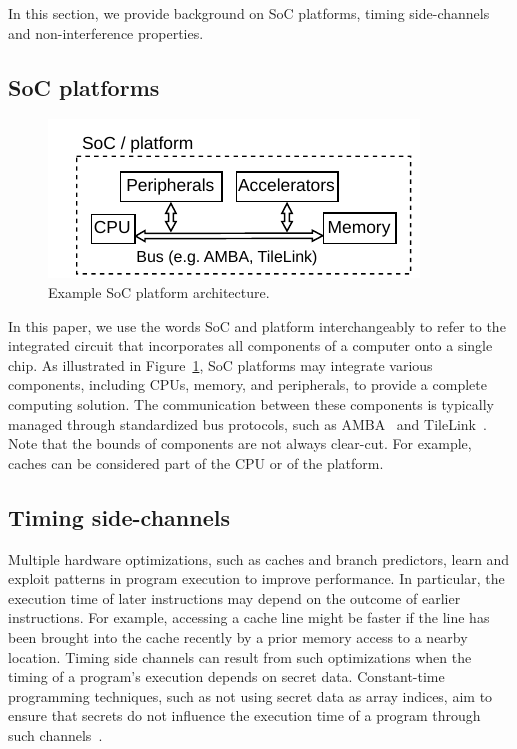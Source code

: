 In this section, we provide background on SoC platforms, timing side-channels and non-interference properties.

\subsection{SoC platforms}

\begin{figure}[t]
    \begin{center}
    \includegraphics[width=1\columnwidth]{figures/exampleplatform/exampleplatform.pdf}
    \end{center}
    \vspace*{-1em}
    \caption{\label{fig:exampleplatform}
        Example SoC platform architecture.
    }
    \vspace*{-1em}
\end{figure}

In this paper, we use the words SoC and platform interchangeably to refer to the integrated circuit that incorporates all components of a computer onto a single chip.
As illustrated in Figure~\ref{fig:exampleplatform}, SoC platforms may integrate various components, including CPUs, memory, and peripherals, to provide a complete computing solution.
The communication between these components is typically managed through standardized bus protocols, such as AMBA~\cite{arm_amba} and TileLink~\cite{tilelink_spec}.
Note that the bounds of components are not always clear-cut.
For example, caches can be considered part of the CPU or of the platform.

\subsection{Timing side-channels}

Multiple hardware optimizations, such as caches and branch predictors, learn and exploit patterns in program execution to improve performance.
In particular, the execution time of later instructions may depend on the outcome of earlier instructions.
For example, accessing a cache line might be faster if the line has been brought into the cache recently by a prior memory access to a nearby location.
Timing side channels can result from such optimizations when the timing of a program's execution depends on secret data.
Constant-time programming techniques, such as not using secret data as array indices, aim to ensure that secrets do not influence the execution time of a program through such channels~\cite{}.


